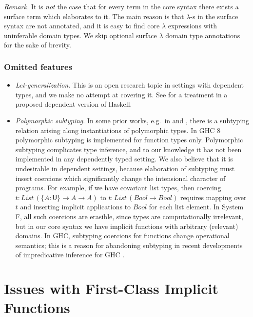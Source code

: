 \documentclass[acmsmall,review,anonymous,prologue,dvipsnames]{acmart}\settopmatter{printfolios=true,printccs=false,printacmref=false}
\renewcommand{\U}{\mathsf{U}}
\newcommand{\mi}[1]{\mathit{#1}}
\theoremstyle{remark}
\begin{document}
\emph{Remark.} It is \emph{not} the case that for every term in the core syntax
there exists a surface term which elaborates to it. The main reason is that
$\lambda$-s in the surface syntax are not annotated, and it is easy to find core
$\lambda$ expressions with uninferable domain types. We skip optional surface
$\lambda$ domain type annotations for the sake of brevity.

\subsubsection{Omitted features}

\begin{itemize}
  \item \emph{Let-generalization}. This is an open research topic in settings
    with dependent types, and we make no attempt at covering it. See
    \cite{eisenberg2016dependent} for a treatment in a proposed dependent
    version of Haskell.
  \item \emph{Polymorphic subtyping}. In some prior works, e.g.\ in
    \cite{dunfield2013complete} and \cite{vytiniotis2008fph}, there is a
    subtyping relation arising along instantiations of polymorphic types. In GHC
    8 polymorphic subtyping is implemented for function types only. Polymorphic
    subtyping complicates type inference, and to our knowledge it has not been
    implemented in any dependently typed setting. We also believe that it is
    undesirable in dependent settings, because elaboration of subtyping must
    insert coercions which significantly change the intensional character of
    programs. For example, if we have covariant list types, then coercing $t :
    \mi{List}\,(\{A : \U\}\to A \to A)$ to $t : \mi{List}\,(\mi{Bool} \to
    \mi{Bool})$ requires mapping over $t$ and inserting implicit applications to
    $\mi{Bool}$ for each list element. In System F, all such coercions are
    erasible, since types are computationally irrelevant, but in our core syntax
    we have implicit functions with arbitrary (relevant) domains. In GHC,
    subtyping coercions for functions change operational semantics; this is a
    reason for abandoning subtyping in recent developments of impredicative
    inference for GHC
    \cite{serrano2020a}.
\end{itemize}

\section{Issues with First-Class Implicit Functions}
\label{sec:issues}
\end{document}
